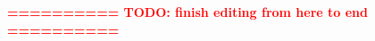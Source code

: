 \documentclass[preprint,12pt,a4paper]{elsarticle}
\begin{document}
%
%
%
%
%






\bigskip\bigskip\textcolor{red}{\textbf{========== TODO: finish editing from here to end ==========}}\bigskip\bigskip

\end{document}
